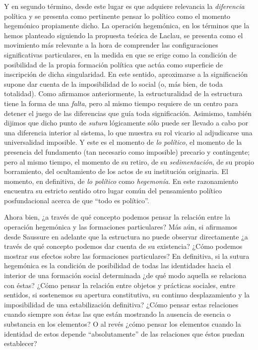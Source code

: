 Y en segundo término, desde este lugar es que adquiere relevancia la \emph{diferencia} política y se presenta como pertinente pensar lo político como el momento hegemónico propiamente dicho. La operación hegemónica, en los términos que la hemos planteado siguiendo la propuesta teórica de Laclau, se presenta como el movimiento más relevante a la hora de comprender las configuraciones significativas particulares, en la medida en que se erige como la condición de posibilidad de la propia formación política que actúa como superficie de inscripción de dicha singularidad. En este sentido, aproximarse a la significación supone dar cuenta de la imposibilidad de lo social (o, más bien, de toda totalidad). Como afirmamos anteriormente, la estructuralidad de la estructura tiene la forma de una \emph{falta}, pero al mismo tiempo requiere de un centro para detener el juego de las diferencias que guía toda significación. Asimismo, también dijimos que dicho punto de \emph{sutura} lógicamente sólo puede ser llevado a cabo por una diferencia interior al sistema, lo que muestra su rol vicario al adjudicarse una universalidad imposible. Y este es el momento de \emph{lo político}, el momento de la presencia del fundamento (tan necesario como imposible) precario y contingente; pero al mismo tiempo, el momento de su retiro, de su \emph{sedimentación}, de su propio borramiento, del ocultamiento de los actos de su institución originaria. El momento, en definitiva, de \emph{lo político} como \emph{hegemonía}. En este razonamiento encuentra su estricto sentido otro lugar común del pensamiento político posfundacional acerca de que ``todo es político''.

Ahora bien, ¿a través de qué concepto podemos pensar la relación entre la operación hegemónica y las formaciones particulares? Más aún, si afirmamos desde Saussure en adelante que la estructura no puede observar directamente ¿a través de qué concepto podemos dar cuenta de su existencia? ¿Cómo podemos mostrar sus efectos sobre las formaciones particulares? En definitiva, si la sutura hegemónica es la condición de posibilidad de todas las identidades hacia el interior de una formación social determinada ¿de qué modo aquella se relaciona con éstas? ¿Cómo pensar la relación entre objetos y prácticas sociales, entre sentidos, si sostenemos su apertura constitutiva, su continuo desplazamiento y la imposibilidad de una estabilización definitiva? ¿Cómo pensar estas relaciones cuando siempre son éstas las que están mostrando la ausencia de esencia o substancia en los elementos? O al revés ¿cómo pensar los elementos cuando la identidad de estos depende ``absolutamente'' de las relaciones que éstos puedan establecer?

